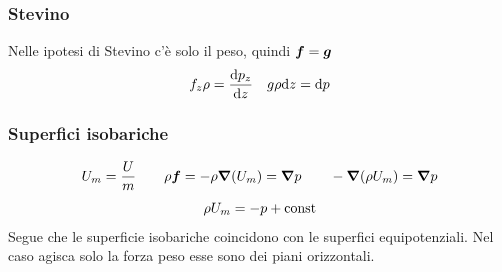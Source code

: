 \subsubsection{Stevino}
Nelle ipotesi di Stevino c'è solo il peso, quindi $\boldsymbol{f}=\boldsymbol{g}$
\begin{equation*}f_z\rho=\frac{\mathrm{d} p_z}{\mathrm{d} z}\quad g\rho\mathrm{d} z=\mathrm{d} p\end{equation*}

\subsubsection{Superfici isobariche}
\begin{equation*}U_m=\frac{U}{m}\qquad \rho\boldsymbol{f}=-\rho\boldsymbol{\nabla}(U_m)=\boldsymbol{\nabla} p\qquad -\boldsymbol{\nabla}(\rho U_m)=\boldsymbol{\nabla} p\end{equation*}
\begin{equation*}\rho U_m=-p+\text{const}\end{equation*}
Segue che le superficie isobariche coincidono con le superfici equipotenziali. Nel caso agisca solo la forza peso esse sono dei piani orizzontali.

